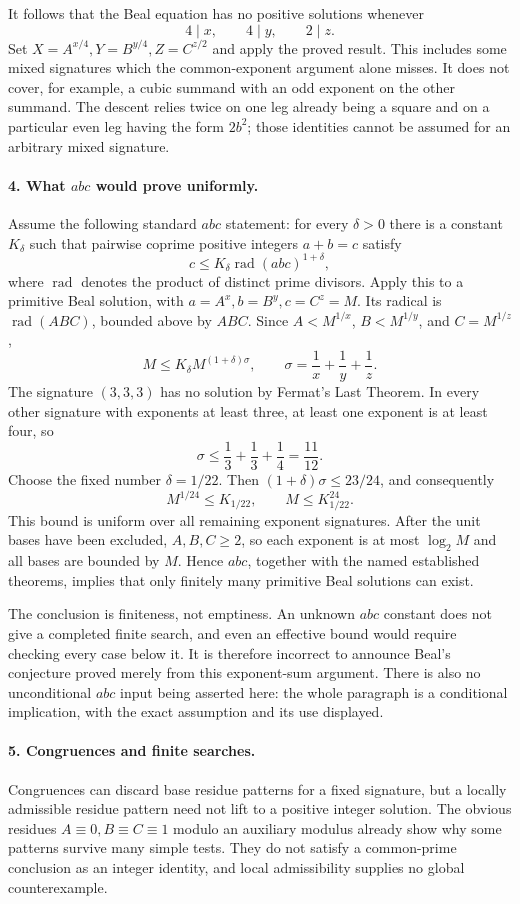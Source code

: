 \documentclass[11pt]{article}
\begin{document}
It follows that the Beal equation has no positive solutions whenever
\[
 4\mid x,\qquad 4\mid y,\qquad 2\mid z.
\]
Set $X=A^{x/4},Y=B^{y/4},Z=C^{z/2}$ and apply the proved result. This includes some mixed signatures which the common-exponent argument alone misses. It does not cover, for example, a cubic summand with an odd exponent on the other summand. The descent relies twice on one leg already being a square and on a particular even leg having the form $2b^2$; those identities cannot be assumed for an arbitrary mixed signature.

\paragraph{4. What $abc$ would prove uniformly.}
Assume the following standard $abc$ statement: for every $\delta>0$ there is a constant $K_\delta$ such that pairwise coprime positive integers $a+b=c$ satisfy
\[
 c\le K_\delta\operatorname{rad}(abc)^{1+\delta},
\]
where $\operatorname{rad}$ denotes the product of distinct prime divisors. Apply this to a primitive Beal solution, with $a=A^x,b=B^y,c=C^z=M$. Its radical is $\operatorname{rad}(ABC)$, bounded above by $ABC$. Since $A<M^{1/x}$, $B<M^{1/y}$, and $C=M^{1/z}$,
\[
 M\le K_\delta M^{(1+\delta)\sigma},\qquad
 \sigma=\frac1x+\frac1y+\frac1z.
\]
The signature $(3,3,3)$ has no solution by Fermat's Last Theorem. In every other signature with exponents at least three, at least one exponent is at least four, so
\[
 \sigma\le\frac13+\frac13+\frac14=\frac{11}{12}.
\]
Choose the fixed number $\delta=1/22$. Then $(1+\delta)\sigma\le23/24$, and consequently
\[
 M^{1/24}\le K_{1/22},\qquad M\le K_{1/22}^{24}.
\]
This bound is uniform over all remaining exponent signatures. After the unit bases have been excluded, $A,B,C\ge2$, so each exponent is at most $\log_2M$ and all bases are bounded by $M$. Hence $abc$, together with the named established theorems, implies that only finitely many primitive Beal solutions can exist.

The conclusion is finiteness, not emptiness. An unknown $abc$ constant does not give a completed finite search, and even an effective bound would require checking every case below it. It is therefore incorrect to announce Beal's conjecture proved merely from this exponent-sum argument. There is also no unconditional $abc$ input being asserted here: the whole paragraph is a conditional implication, with the exact assumption and its use displayed.

\paragraph{5. Congruences and finite searches.}
Congruences can discard base residue patterns for a fixed signature, but a locally admissible residue pattern need not lift to a positive integer solution. The obvious residues $A\equiv0,B\equiv C\equiv1$ modulo an auxiliary modulus already show why some patterns survive many simple tests. They do not satisfy a common-prime conclusion as an integer identity, and local admissibility supplies no global counterexample.
\end{document}
